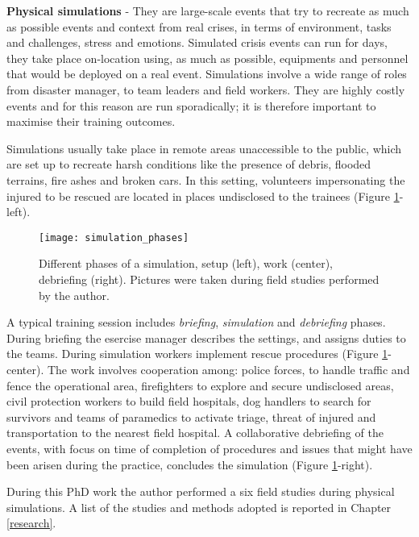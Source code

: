 \textbf{Physical simulations} - They are large-scale events that try to recreate as much as possible events and context from real crises, in terms of environment, tasks and challenges, stress and emotions. Simulated crisis events can run for days, they take place on-location using, as much as possible, equipments and personnel that would be deployed on a real event. Simulations involve a wide range of roles from disaster manager, to team leaders and field workers. They are highly costly events and for this reason are run sporadically; it is therefore important to maximise their training outcomes.

Simulations usually take place in remote areas unaccessible to the public, which are set up to recreate harsh conditions like the presence of debris, flooded terrains, fire ashes and broken cars. In this setting, volunteers impersonating the injured to be rescued are located in places undisclosed to the trainees (Figure \ref{fig:simulation-phases}-left).
\begin{figure}
	[tbh] \centering 
	\texttt{[image: simulation\_phases]} \caption{Different phases of a simulation, setup (left), work (center), debriefing (right). Pictures were taken during field studies performed by the author.} \label{fig:simulation-phases} 
\end{figure}

A typical training session includes \emph{briefing}, \emph{simulation} and \emph{debriefing} phases. During briefing the esercise manager describes the settings, and assigns duties to the teams. During simulation workers implement rescue procedures (Figure \ref{fig:simulation-phases}-center). The work involves cooperation among: police forces, to handle traffic and fence the operational area, firefighters to explore and secure undisclosed areas, civil protection workers to build field hospitals, dog handlers to search for survivors and teams of paramedics to activate triage, threat of injured and transportation to the nearest field hospital. A collaborative debriefing of the events, with focus on time of completion of procedures and issues that might have been arisen during the practice, concludes the simulation (Figure \ref{fig:simulation-phases}-right).

During this PhD work the author performed a six field studies during physical simulations. A list of the studies and methods adopted is reported in Chapter \ref{research}.

